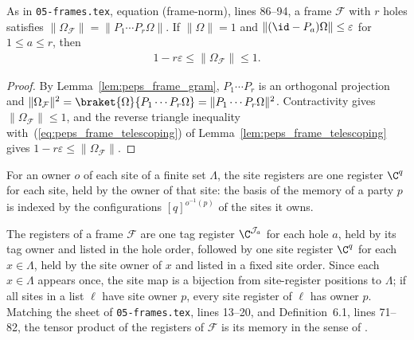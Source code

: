 \begin{lemma}
    \label{thm:peps_frame_norm}
    \leanok
    As in \texttt{05-frames.tex}, equation (frame-norm), lines 86--94, a frame $\mathcal F$ with $r$ holes satisfies $\lVert\Omega_{\mathcal F}\rVert
        =\lVert P_1\cdots P_r\Omega\rVert$. If $\lVert\Omega\rVert=1$ and
    $\lVert(\id-P_a)\Omega\rVert\le\varepsilon$ for $1\le a\le r$, then
    \begin{align}
        1-r\varepsilon\le\lVert\Omega_{\mathcal F}\rVert\le1 .
        \label{eq:peps_frame_norm}
    \end{align}
\end{lemma}

\begin{proof}\leanok
    By Lemma~\ref{lem:peps_frame_gram}, $P_1\cdots P_r$ is an orthogonal projection and
    $\lVert\Omega_{\mathcal F}\rVert^2=\braket{\Omega}{P_1\cdots P_r\Omega}=\lVert P_1\cdots P_r\Omega\rVert^2$. Contractivity gives $\lVert\Omega_{\mathcal F}\rVert\le1$, and the reverse triangle inequality
    with~(\ref{eq:peps_frame_telescoping}) of Lemma~\ref{lem:peps_frame_telescoping} gives $1-r\varepsilon\le\lVert\Omega_{\mathcal F}\rVert$.
\end{proof}

\begin{definition}
    \label{def:lattice_site_registers}
    \leanok
    For an owner $o$ of each site of a finite set $\Lambda$, the site
    registers are one register $\C^q$ for each site, held by the owner of that
    site: the basis of the memory of a party $p$ is indexed by the
    configurations $[q]^{o^{-1}(p)}$ of the sites it owns.
\end{definition}

\begin{definition}
    \label{def:peps_frame_registers}
    \leanok
    The registers of a frame $\mathcal F$ are one tag register $\C^{\mathcal
            J_a}$ for each hole $a$, held by its tag owner and listed in
    the hole order, followed by one site register $\C^q$ for each
    $x\in\Lambda$, held by the site owner of $x$ and listed in a fixed site order. Since each $x\in\Lambda$ appears once, the site map is a bijection from site-register positions to $\Lambda$; if all sites in a list $\ell$ have site owner $p$, every site
    register of $\ell$ has owner $p$. Matching the
    sheet of \texttt{05-frames.tex}, lines 13--20, and Definition~6.1, lines 71--82, the tensor product of the registers of $\mathcal F$
    is its memory in the sense of \cite[Theorem~5.2]{OpenAI2026PolynomialPEPS}.
\end{definition}

